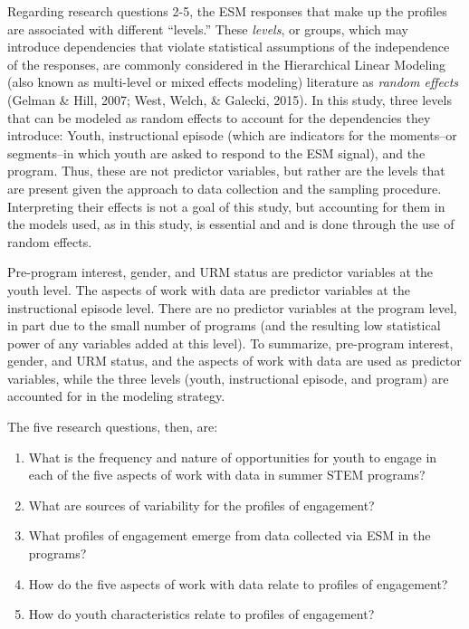 \documentclass[]{book}
\providecommand{\tightlist}{%
  \setlength{\itemsep}{0pt}\setlength{\parskip}{0pt}}
\theoremstyle{definition}
\theoremstyle{definition}
\theoremstyle{definition}
\theoremstyle{remark}
\begin{document}
Regarding research questions 2-5, the ESM responses that make up the
profiles are associated with different ``levels.'' These \emph{levels},
or groups, which may introduce dependencies that violate statistical
assumptions of the independence of the responses, are commonly
considered in the Hierarchical Linear Modeling (also known as
multi-level or mixed effects modeling) literature as \emph{random
effects} (Gelman \& Hill, 2007; West, Welch, \& Galecki, 2015). In this
study, three levels that can be modeled as random effects to account for
the dependencies they introduce: Youth, instructional episode (which are
indicators for the moments--or segments--in which youth are asked to
respond to the ESM signal), and the program. Thus, these are not
predictor variables, but rather are the levels that are present given
the approach to data collection and the sampling procedure. Interpreting
their effects is not a goal of this study, but accounting for them in
the models used, as in this study, is essential and and is done through
the use of random effects.

Pre-program interest, gender, and URM status are predictor variables at
the youth level. The aspects of work with data are predictor variables
at the instructional episode level. There are no predictor variables at
the program level, in part due to the small number of programs (and the
resulting low statistical power of any variables added at this level).
To summarize, pre-program interest, gender, and URM status, and the
aspects of work with data are used as predictor variables, while the
three levels (youth, instructional episode, and program) are accounted
for in the modeling strategy.

The five research questions, then, are:

\begin{enumerate}
\def\labelenumi{\arabic{enumi}.}
\tightlist
\item
  What is the frequency and nature of opportunities for youth to engage
  in each of the five aspects of work with data in summer STEM programs?
\item
  What are sources of variability for the profiles of engagement?
\item
  What profiles of engagement emerge from data collected via ESM in the
  programs?
\item
  How do the five aspects of work with data relate to profiles of
  engagement?
\item
  How do youth characteristics relate to profiles of engagement?
\end{enumerate}
\end{document}
